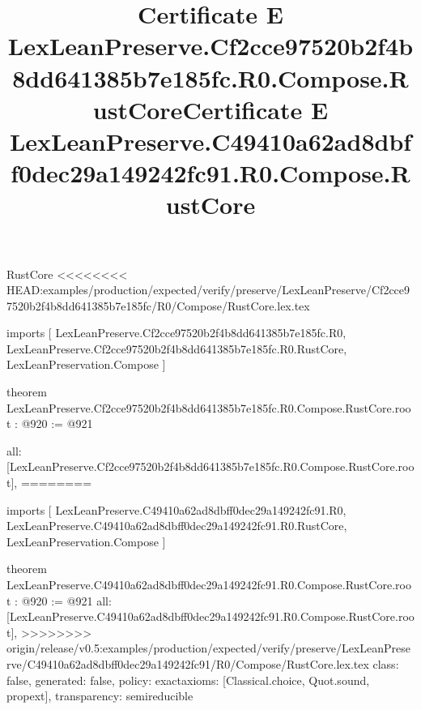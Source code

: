 \begin{lexlean}{RustCore}
<<<<<<<< HEAD:examples/production/expected/verify/preserve/LexLeanPreserve/Cf2cce97520b2f4b8dd641385b7e185fc/R0/Compose/RustCore.lex.tex
\title{Certificate E LexLeanPreserve.Cf2cce97520b2f4b8dd641385b7e185fc.R0.Compose.RustCore}
\begin{coremodule}
imports [
  LexLeanPreserve.Cf2cce97520b2f4b8dd641385b7e185fc.R0,
  LexLeanPreserve.Cf2cce97520b2f4b8dd641385b7e185fc.R0.RustCore,
  LexLeanPreservation.Compose
]

theorem LexLeanPreserve.Cf2cce97520b2f4b8dd641385b7e185fc.R0.Compose.RustCore.root : @920 := @921 {
  all: [LexLeanPreserve.Cf2cce97520b2f4b8dd641385b7e185fc.R0.Compose.RustCore.root],
========
\title{Certificate E LexLeanPreserve.C49410a62ad8dbff0dec29a149242fc91.R0.Compose.RustCore}
\begin{coremodule}
imports [
  LexLeanPreserve.C49410a62ad8dbff0dec29a149242fc91.R0,
  LexLeanPreserve.C49410a62ad8dbff0dec29a149242fc91.R0.RustCore,
  LexLeanPreservation.Compose
]

theorem LexLeanPreserve.C49410a62ad8dbff0dec29a149242fc91.R0.Compose.RustCore.root : @920 := @921 {
  all: [LexLeanPreserve.C49410a62ad8dbff0dec29a149242fc91.R0.Compose.RustCore.root],
>>>>>>>> origin/release/v0.5:examples/production/expected/verify/preserve/LexLeanPreserve/C49410a62ad8dbff0dec29a149242fc91/R0/Compose/RustCore.lex.tex
  class: false,
  generated: false,
  policy: exact{axioms: [Classical.choice, Quot.sound, propext]},
  transparency: semireducible
}


\end{coremodule}}
\end{coremodule}
\end{lexlean}
